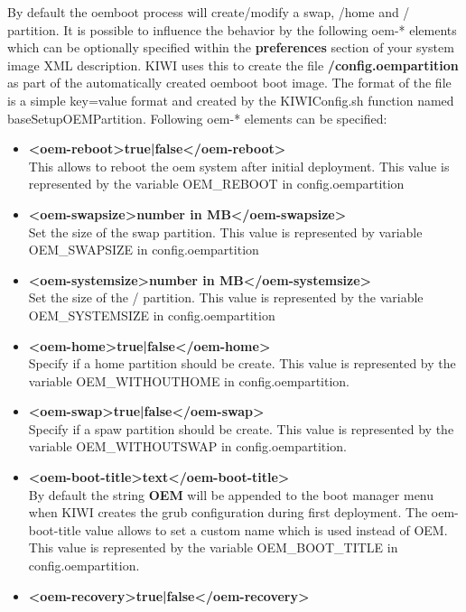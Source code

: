 By default the oemboot process will create/modify a swap, /home and /
partition. It is possible to influence the behavior by the following
oem-* elements which can be optionally specified within the
\textbf{preferences} section of your system image XML description.
KIWI uses this to create the file \textbf{/config.oempartition} as part
of the automatically created oemboot boot image. The format of the
file is a simple key=value format and created by the KIWIConfig.sh
function named baseSetupOEMPartition. Following oem-* elements can
be specified:

\begin{itemize}
\item \textbf{<oem-reboot>true|false</oem-reboot>}\\
      This allows to reboot the oem system after initial deployment.
      This value is represented by the variable OEM\_REBOOT in
      config.oempartition
\item \textbf{<oem-swapsize>number in MB</oem-swapsize>}\\
      Set the size of the swap partition. This value is represented by
      variable OEM\_SWAPSIZE in config.oempartition
\item \textbf{<oem-systemsize>number in MB</oem-systemsize>}\\
      Set the size of the / partition. This value is represented by the
      variable OEM\_SYSTEMSIZE in config.oempartition
\item \textbf{<oem-home>true|false</oem-home>}\\
      Specify if a home partition should be create. This value is represented
      by the variable OEM\_WITHOUTHOME in config.oempartition.
\item \textbf{<oem-swap>true|false</oem-swap>}\\
      Specify if a spaw partition should be create. This value is represented 
      by the variable OEM\_WITHOUTSWAP in config.oempartition.
\item \textbf{<oem-boot-title>text</oem-boot-title>}\\
      By default the string \textbf{OEM} will be appended to the
      boot manager menu when KIWI creates the grub configuration during
      first deployment. The oem-boot-title value allows to set a custom
      name which is used instead of OEM. This value is represented
      by the variable OEM\_BOOT\_TITLE in config.oempartition.
\item \textbf{<oem-recovery>true|false</oem-recovery>}\\

\end{itemize}
